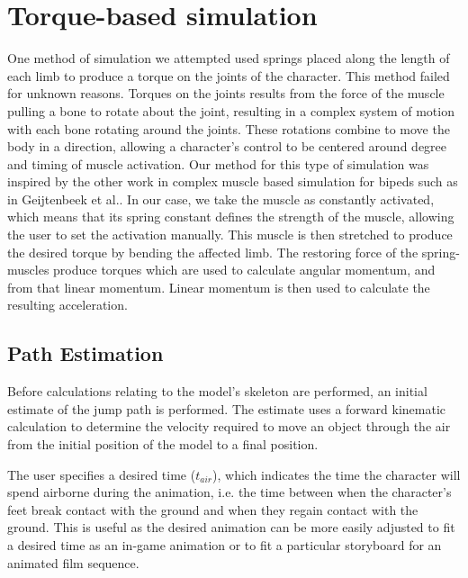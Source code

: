 \section{Torque-based simulation}
\label{section:torque}
One method of simulation we attempted used springs placed along the length of each limb to produce a torque on the joints of the character.  This method failed for unknown reasons.  Torques on the joints results from the force of the muscle pulling a bone to rotate about the joint, resulting in a complex system of motion with each bone rotating around the joints.  These rotations combine to move the body in a direction, allowing a character's control to be centered around degree and timing of muscle activation. Our method for this type of simulation was inspired by the other work in complex muscle based simulation for bipeds such as in Geijtenbeek et al.. \cite{muscle_based_bipeds}  In our case, we take the muscle as constantly activated, which means that its spring constant defines the strength of the muscle, allowing the user to set the activation manually.  This muscle is then stretched to produce the desired torque by bending the affected limb.  The restoring force of the spring-muscles produce torques which are used to calculate angular momentum, and from that linear momentum.  Linear momentum is then used to calculate the resulting acceleration.

\subsection{Path Estimation}
\label{subsection:torque_path}
%	

Before calculations relating to the model's skeleton are performed, an initial estimate of the jump path is performed.  The estimate uses a forward kinematic calculation to determine the velocity required to move an object through the air from the initial position of the model to a final position.

The user specifies a desired time ($t_{air}$), which indicates the time the character will spend airborne during the animation, i.e. the time between when the character's feet break contact with the ground and when they regain contact with the ground.  This is useful as the desired animation can be more easily adjusted to fit a desired time as an in-game animation or to fit a particular storyboard for an animated film sequence.

